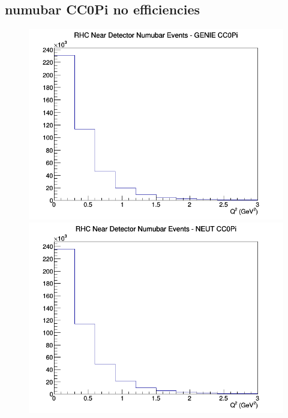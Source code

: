 \documentclass[12pt]{article}
\begin{document}
\subsection{numubar CC0Pi no efficiencies}
\begin{figure}[h]
\includegraphics[width=\linewidth]{Q2/nominal/CC0Pi_RHC_ND_numubar_Q2_GENIE.png}
\endminipage
{}
\includegraphics[width=\linewidth]{Q2/nominal/CC0Pi_RHC_ND_numubar_Q2_NEUT.png}
\endminipage
{}

\end{figure}
\end{document}
